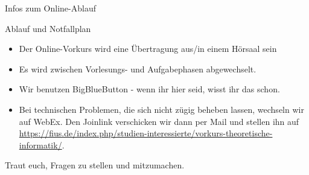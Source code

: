 
\begin{frame}[fragile]{Infos zum Online-Ablauf}
	\begin{alertblock}{Ablauf und Notfallplan}
		\begin{itemize}
            \item Der Online-Vorkurs wird eine Übertragung aus/in einem Hörsaal sein
			\item Es wird zwischen Vorlesungs- und Aufgabephasen abgewechselt.
			\item Wir benutzen BigBlueButton - wenn ihr hier seid, wisst ihr das schon. 
            \item Bei technischen Problemen, die sich nicht zügig beheben lassen, wechseln wir auf WebEx. Den Joinlink verschicken wir dann per Mail und stellen ihn auf \url{https://fius.de/index.php/studien-interessierte/vorkurs-theoretische-informatik/}.
		\end{itemize}
		\alert{Traut euch, Fragen zu stellen und mitzumachen.}
	\end{alertblock}
\end{frame}
